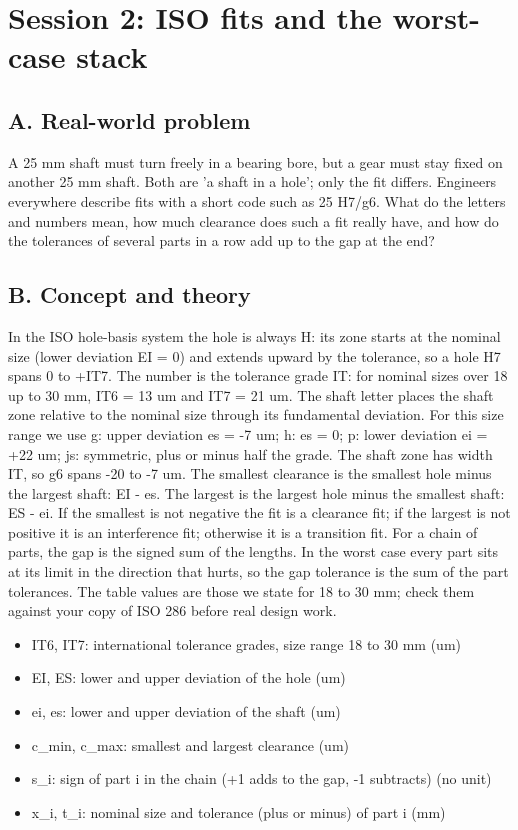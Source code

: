 \documentclass[11pt,a4paper]{article}
\begin{document}
\section{Session 2: ISO fits and the worst-case stack}

\subsection*{A. Real-world problem}
A 25 mm shaft must turn freely in a bearing bore, but a gear must stay fixed on another 25 mm shaft. Both are 'a shaft in a hole'; only the fit differs. Engineers everywhere describe fits with a short code such as 25 H7/g6. What do the letters and numbers mean, how much clearance does such a fit really have, and how do the tolerances of several parts in a row add up to the gap at the end?

\subsection*{B. Concept and theory}
In the ISO hole-basis system the hole is always H: its zone starts at the nominal size (lower deviation EI = 0) and extends upward by the tolerance, so a hole H7 spans 0 to +IT7. The number is the tolerance grade IT: for nominal sizes over 18 up to 30 mm, IT6 = 13 um and IT7 = 21 um. The shaft letter places the shaft zone relative to the nominal size through its fundamental deviation. For this size range we use g: upper deviation es = -7 um; h: es = 0; p: lower deviation ei = +22 um; js: symmetric, plus or minus half the grade. The shaft zone has width IT, so g6 spans -20 to -7 um. The smallest clearance is the smallest hole minus the largest shaft: EI - es. The largest is the largest hole minus the smallest shaft: ES - ei. If the smallest is not negative the fit is a clearance fit; if the largest is not positive it is an interference fit; otherwise it is a transition fit. For a chain of parts, the gap is the signed sum of the lengths. In the worst case every part sits at its limit in the direction that hurts, so the gap tolerance is the sum of the part tolerances. The table values are those we state for 18 to 30 mm; check them against your copy of ISO 286 before real design work.

\begin{itemize}[nosep]
\item IT6, IT7: international tolerance grades, size range 18 to 30 mm (um)
\item EI, ES: lower and upper deviation of the hole (um)
\item ei, es: lower and upper deviation of the shaft (um)
\item c\_min, c\_max: smallest and largest clearance (um)
\item s\_i: sign of part i in the chain (+1 adds to the gap, -1 subtracts) (no unit)
\item x\_i, t\_i: nominal size and tolerance (plus or minus) of part i (mm)
\end{itemize}
\end{document}
